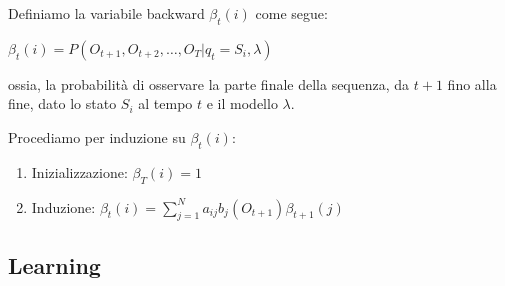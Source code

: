\documentclass[slidestop,mathserif,red]{beamer}
\begin{document}
\begin{frame}
 \begin{block}{}
  Definiamo la variabile backward $\beta_{t}(i)$ come segue:
\begin{center}
 $\beta_{t}(i) = P(O_{t+1}, O_{t+2}, \ldots, O_{T} | q_{t} = S_{i}, \lambda)$
\end{center}
ossia, la probabilit\`a di osservare la parte finale della sequenza, da $t+1$ fino alla fine, dato lo stato $S_{i}$ al tempo $t$ e il modello $\lambda$.
 \end{block}
\begin{block}{}
	Procediamo per induzione su $\beta_{t}(i)$:
	\begin{enumerate}
 	\item Inizializzazione: $\beta_{T}(i) = 1$
	\item Induzione: $\beta_{t}(i) = \sum_{j = 1}^{N} a_{ij}b_{j}(O_{t+1})\beta_{t+1}(j)$
	\end{enumerate}
    
\end{block}
 
\end{frame}



\subsection{Learning}
\end{document}
